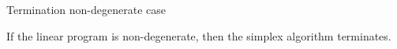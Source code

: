 \begin{frame}{Termination non-degenerate case}



\begin{theorem}
  \label{thr:s-5}
  If the linear program  is non-degenerate, then the
  simplex algorithm terminates.
\end{theorem}
  
  \begin{columns}
    \begin{column}{.5\textwidth}
      
    \end{column}
    \begin{column}{.5\textwidth}
      
    \end{column}       
  \end{columns}
\end{frame}



\begin{frame}{}

  \begin{columns}
    \begin{column}{.5\textwidth}
      
    \end{column}
    \begin{column}{.5\textwidth}
      
    \end{column}       
  \end{columns}
\end{frame}



